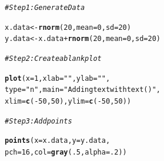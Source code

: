 \documentclass{tufte-book}\usepackage[]{graphicx}\usepackage[]{color}
\makeatletter
\newcommand{\hlnum}[1]{\textcolor[rgb]{0.686,0.059,0.569}{#1}}%
\newcommand{\hlstr}[1]{\textcolor[rgb]{0.192,0.494,0.8}{#1}}%
\newcommand{\hlcom}[1]{\textcolor[rgb]{0.678,0.584,0.686}{\textit{#1}}}%
\newcommand{\hlopt}[1]{\textcolor[rgb]{0,0,0}{#1}}%
\newcommand{\hlstd}[1]{\textcolor[rgb]{0.345,0.345,0.345}{#1}}%
\newcommand{\hlkwb}[1]{\textcolor[rgb]{0.69,0.353,0.396}{#1}}%
\newcommand{\hlkwc}[1]{\textcolor[rgb]{0.333,0.667,0.333}{#1}}%
\newcommand{\hlkwd}[1]{\textcolor[rgb]{0.737,0.353,0.396}{\textbf{#1}}}%
\newenvironment{kframe}{%
 \def\at@end@of@kframe{}%
 \ifinner\ifhmode%
  \def\at@end@of@kframe{\end{minipage}}%
  \begin{minipage}{\columnwidth}%
 \fi\fi%
 \def\FrameCommand##1{\hskip\@totalleftmargin \hskip-\fboxsep
 \colorbox{shadecolor}{##1}\hskip-\fboxsep
     \hskip-\linewidth \hskip-\@totalleftmargin \hskip\columnwidth}%
 \MakeFramed {\advance\hsize-\width
   \@totalleftmargin\z@ \linewidth\hsize
   \@setminipage}}%
 {\par\unskip\endMakeFramed%
 \at@end@of@kframe}
\newenvironment{knitrout}{}{} %
\makeatother
\begin{document}
\begin{marginfigure}
\begin{tiny}
\begin{knitrout}
\color{fgcolor}\begin{kframe}
\begin{alltt}
\hlcom{# Step 1: Generate Data}

\hlstd{x.data} \hlkwb{<-} \hlkwd{rnorm}\hlstd{(}\hlnum{20}\hlstd{,} \hlkwc{mean} \hlstd{=} \hlnum{0}\hlstd{,} \hlkwc{sd} \hlstd{=} \hlnum{20}\hlstd{)}
\hlstd{y.data} \hlkwb{<-} \hlstd{x.data} \hlopt{+} \hlkwd{rnorm}\hlstd{(}\hlnum{20}\hlstd{,} \hlkwc{mean} \hlstd{=} \hlnum{0}\hlstd{,} \hlkwc{sd} \hlstd{=} \hlnum{20}\hlstd{)}

\hlcom{# Step 2:  Create a blank plot}

\hlkwd{plot}\hlstd{(}\hlkwc{x} \hlstd{=} \hlnum{1}\hlstd{,} \hlkwc{xlab} \hlstd{=} \hlstr{""}\hlstd{,} \hlkwc{ylab} \hlstd{=} \hlstr{""}\hlstd{,}
     \hlkwc{type} \hlstd{=} \hlstr{"n"}\hlstd{,} \hlkwc{main} \hlstd{=} \hlstr{"Adding text with text()"}\hlstd{,}
     \hlkwc{xlim} \hlstd{=} \hlkwd{c}\hlstd{(}\hlopt{-}\hlnum{50}\hlstd{,} \hlnum{50}\hlstd{),} \hlkwc{ylim} \hlstd{=} \hlkwd{c}\hlstd{(}\hlopt{-}\hlnum{50}\hlstd{,} \hlnum{50}\hlstd{))}

\hlcom{# Step 3: Add points}

\hlkwd{points}\hlstd{(}\hlkwc{x} \hlstd{= x.data,} \hlkwc{y} \hlstd{= y.data,}
       \hlkwc{pch} \hlstd{=} \hlnum{16}\hlstd{,} \hlkwc{col} \hlstd{=} \hlkwd{gray}\hlstd{(}\hlnum{.5}\hlstd{,} \hlkwc{alpha} \hlstd{=} \hlnum{.2}\hlstd{))}


\end{alltt}
\end{kframe}
\end{knitrout}
\end{tiny}
\end{marginfigure}
\end{document}
